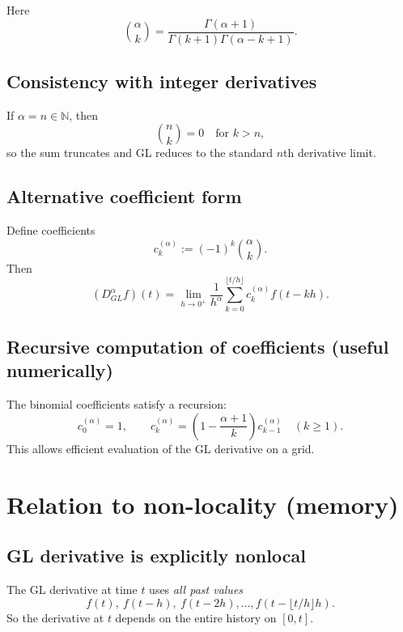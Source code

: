 Here
\begin{equation}
\boxed{
\binom{\alpha}{k}
=
\frac{\Gamma(\alpha+1)}{\Gamma(k+1)\Gamma(\alpha-k+1)}.
}
\end{equation}

\subsection{Consistency with integer derivatives}
If $\alpha=n\in\mathbb{N}$, then
\[
\binom{n}{k}=0\quad \text{for }k>n,
\]
so the sum truncates and GL reduces to the standard $n$th derivative limit.

\subsection{Alternative coefficient form}
Define coefficients
\begin{equation}
c_k^{(\alpha)} := (-1)^k\binom{\alpha}{k}.
\end{equation}
Then
\begin{equation}
(D_{GL}^\alpha f)(t)
=
\lim_{h\to 0^+}\frac{1}{h^\alpha}
\sum_{k=0}^{\lfloor t/h\rfloor}c_k^{(\alpha)}f(t-kh).
\end{equation}

\subsection{Recursive computation of coefficients (useful numerically)}
The binomial coefficients satisfy a recursion:
\begin{equation}
c_0^{(\alpha)}=1,
\qquad
c_k^{(\alpha)}=\left(1-\frac{\alpha+1}{k}\right)c_{k-1}^{(\alpha)}
\quad (k\ge 1).
\end{equation}
This allows efficient evaluation of the GL derivative on a grid.


\section{Relation to non-locality (memory)}

\subsection{GL derivative is explicitly nonlocal}
The GL derivative at time $t$ uses \emph{all past values}
\[
f(t),\ f(t-h),\ f(t-2h),\dots,f(t-\lfloor t/h\rfloor h).
\]
So the derivative at $t$ depends on the entire history on $[0,t]$.

